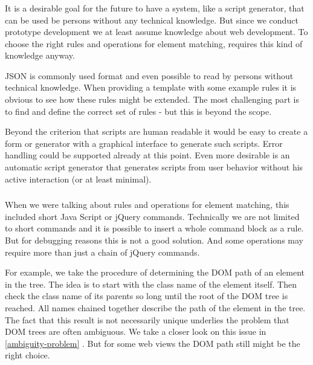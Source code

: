 \subsubsection[Syntax]{\reqSiii}

It is a desirable goal for the future to have a system, like a script generator, that can be used be persons without any technical knowledge. But since we conduct prototype development we at least assume knowledge about web development. To choose the right rules and operations for element matching, requires this kind of knowledge anyway. 

JSON is commonly used format and even possible to read by persons without technical knowledge. When providing a template with some example rules it is obvious to see how these rules might be extended. 
The most challenging part is to find and define the correct set of rules - but this is beyond the scope. 

Beyond the criterion that scripts are human readable it would be easy to create a form or generator with a graphical interface to generate such scripts. Error handling could be supported already at this point. Even more desirable is an automatic script generator that generates scripts from user behavior without his active interaction (or at least minimal). 

\subsubsection[Plugin Extension]{\reqSiv}

When we were talking about rules and operations for element matching, this included short Java Script or jQuery commands. Technically we are not limited to short commands and it is possible to insert a whole command block as a rule. But for debugging reasons this is not a good solution. And some operations may require more than just a chain of jQuery commands. 

For example, we take the procedure of determining the DOM path of an element in the tree. The idea is to start with the class name of the element itself. Then check the class name of its parents so long until the root of the DOM tree is reached. All names chained together describe the path of the element in the tree. The fact that this result is not necessarily unique underlies the problem that DOM trees are often ambiguous. We take a closer look on this issue in \ref{ambiguity-problem} . But for some web views the DOM path still might be the right choice. 

